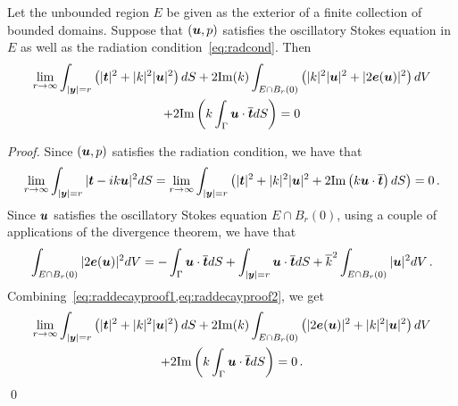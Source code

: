 \begin{lemma}
  \label{lem:rep}
  Let the unbounded region $E$ be given as the exterior
  of a finite collection of bounded domains.
  Suppose that $({\boldsymbol u},p)$ satisfies the oscillatory Stokes equation in 
  $E$ as well as the radiation condition~\cref{eq:radcond}. 
  Then 
  \begin{multline}
    \label{eq:repinfest}  
    \lim_{r\to\infty}
    \int_{|{\boldsymbol y}|=r} \left( |{\boldsymbol t}|^2 + |k|^2 |{\boldsymbol u}|^2 \right) dS +
    2 {\textrm{\textup{Im}}}(k) \int_{E \cap B_{r}(0)} \left(|k|^2 |{\boldsymbol u}|^2 + |2{\boldsymbol e}({\boldsymbol u})|^2 \right)
    dV \\
    + 2 {\textrm{\textup{Im}}} \left( k \int_{\Gamma} {\boldsymbol u} \cdot 
\overline{{\boldsymbol t}} dS  \right) = 0
  \end{multline}
  
\end{lemma}

\begin{proof}
Since $({\boldsymbol u},p)$ satisfies the radiation condition, we have that
\begin{equation}
\lim_{r\to\infty} \int_{|{\boldsymbol y}|=r} | {\boldsymbol t} - i k {\boldsymbol u}|^2 dS = 
\lim_{r\to\infty} \int_{|{\boldsymbol y}| =r} \left( |{\boldsymbol t}|^2 + |k|^2|{\boldsymbol u}|^2 + 2 {\textrm{\textup{Im}}} 
\left( k {\boldsymbol u}\cdot \overline{{\boldsymbol t}} \right) dS \label{eq:raddecayproof1}
\right) = 0 \, . 
\end{equation}
Since ${\boldsymbol u}$ satisfies the oscillatory Stokes equation $E \cap B_{r}(0)$,
using a couple of applications of the divergence theorem, we have that
\begin{equation}
\int_{E\cap B_{r}(0)} |2 {\boldsymbol e}({\boldsymbol u})|^2 dV =
-\int_{\Gamma} {\boldsymbol u} \cdot \overline{{\boldsymbol t}} dS
+ \int_{|{\boldsymbol y}|=r} {\boldsymbol u} \cdot \overline{{\boldsymbol t}} dS + \overline{k}^2 
\int_{E \cap B_{r}(0)} |{\boldsymbol u}|^2 dV \,. \label{eq:raddecayproof2}
\end{equation}
Combining~\cref{eq:raddecayproof1,eq:raddecayproof2}, we get
\begin{multline*}
\lim_{r\to\infty} \int_{|{\boldsymbol y}|=r}\left(|{\boldsymbol t}|^2 + |k|^2 |{\boldsymbol u}|^2 \right) dS 
+ 2 {\textrm{\textup{Im}}}(k)\int_{E \cap B_{r}(0)} \left(|2{\boldsymbol e}({\boldsymbol u})|^2 + |k|^2 |{\boldsymbol u}|^2 
\right) dV \\
+ 2{\textrm{\textup{Im}}} \left ( k \int_{\Gamma} {\boldsymbol u} \cdot \overline{{\boldsymbol t}} dS \right) = 0 \, .
\end{multline*}
\qed
\end{proof}

